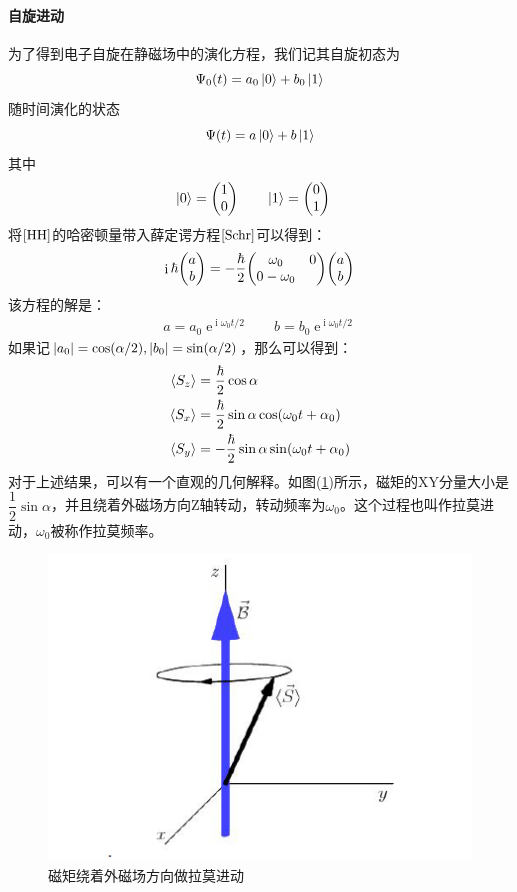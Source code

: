 \documentclass[a4paper]{article}
\DeclareMathOperator{\e}{\mathrm{e}}
\DeclareMathOperator{\I}{\mathrm{i}}
\begin{document}
\paragraph{自旋进动}
为了得到电子自旋在静磁场中的演化方程，我们记其自旋初态为
\begin{equation}\label{key}
\Psi_0(t) = a_0\ket{0} + b_0\ket{1}
\end{equation}
随时间演化的状态
\begin{equation}\label{key}
\Psi(t) = a\ket{0} + b\ket{1}
\end{equation}
其中
\begin{align}\label{key}
\ket{0} = \mqty(1\\ 0) & \qquad \ket{1} = \mqty(0\\ 1)
\end{align}
将$ \eqref{HH} $的哈密顿量带入薛定谔方程$ \eqref{Schr} $可以得到：
\begin{equation}\label{key}
\I\hbar\mqty(a\\ b) = -\dfrac{\hbar}{2}\mqty(\omega_0 & 0\\ 0 -\omega_0) \mqty(a\\ b)
\end{equation}
该方程的解是：
\begin{align}\label{key}
a = a_0\e^{\I \omega_0 t/2} &\quad  b = b_0\e^{\I \omega_0 t/2}
\end{align}
如果记$ \abs{a_0} = \cos(\alpha/2), \abs{b_0} = \sin(\alpha/2) $，那么可以得到：
\begin{align}
\ev{S_z} &= \dfrac{\hbar}{2}\cos\alpha \\
\ev{S_x} &= \dfrac{\hbar}{2}\sin\alpha\cos(\omega_0 t + \alpha_0) \\
\ev{S_y} &= -\dfrac{\hbar}{2}\sin\alpha\sin(\omega_0 t + \alpha_0) \\
\end{align}
对于上述结果，可以有一个直观的几何解释。如图(\ref{fig:larmor})所示，磁矩的XY分量大小是$ \dfrac{1}{2}\sin\alpha $，并且绕着外磁场方向Z轴转动，转动频率为$ \omega_0 $。这个过程也叫作拉莫进动，$ \omega_0 $被称作拉莫频率。
\begin{figure}[H]
	\centering
	\includegraphics[width=0.5\linewidth]{fig/larmor.jpg}
	\caption{磁矩绕着外磁场方向做拉莫进动}
	\label{fig:larmor}
\end{figure}
\end{document}
